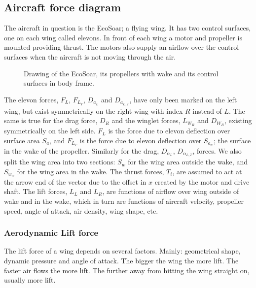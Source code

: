 
\subsection{Aircraft force diagram}
The aircraft in question is the EcoSoar; a flying wing.
It has two control surfaces, one on each wing called elevons.
In front of each wing a motor and propeller is mounted providing thrust.
The motors also supply an airflow over the control surfaces when the aircraft is not moving through the air.


\begin{figure}[h]
    \center
    \begin{tikzpicture}
    
    \end{tikzpicture}
    \caption{Drawing of the EcoSoar, its propellers with wake and its control surfaces in body frame.}
    \label{airplane}
\end{figure}

The elevon forces, $F_L$, $F_{L_T}$, $D_{a_{L}}$ and $D_{a_{L,T}}$, have only been marked on the left wing, but exist symmetrically on the right wing with index $R$ instead of $L$.
The same is true for the drag force, $D_R$ and the winglet forces, $L_{W_R}$ and $D_{W_R}$, existing symmetrically on the left side.
$F_L$ is the force due to elevon deflection over surface area $S_a$, and $F_{L_T}$ is the force due to elevon deflection over $S_{a_w}$; the surface in the wake of the propeller.
Similarly for the drag, $D_{\alpha_L}$, $D_{\alpha_{L,T}}$, forces.
We also split the wing area into two sections: $S_w$ for the wing area outside the wake, and $S_{w_w}$ for the wing area in the wake.
The thrust forces, $T_i$, are assumed to act at the arrow end of the vector due to the offset in $x$ created by the motor and drive shaft.
The lift forces, $L_L$ and $L_R$, are functions of airflow over wing outside of wake and in the wake, which in turn are functions of aircraft velocity, propeller speed, angle of attack, air density, wing shape, etc.



\subsubsection{Aerodynamic Lift force}

The lift force of a wing depends on several factors.
Mainly: geometrical shape, dynamic pressure and angle of attack.\cite{aerodynamics}
The bigger the wing the more lift.
The faster air flows the more lift.
The further away from hitting the wing straight on, usually more lift.

